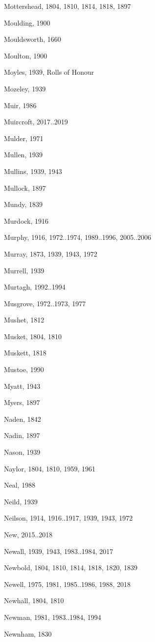 \begin{theindex}
\item Mottershead, 1804, 1810, 1814, 1818, 1897
\item Moulding, 1900
\item Mouldsworth, 1660
\item Moulton, 1900
\item Moyles, 1939, Rolls of Honour
\item Mozeley, 1939
\item Muir, 1986
\item Muircroft, 2017..2019
\item Mulder, 1971
\item Mullen, 1939
\item Mullins, 1939, 1943
\item Mullock, 1897
\item Mundy, 1839
\item Murdock, 1916
\item Murphy, 1916, 1972..1974, 1989..1996, 2005..2006
\item Murray, 1873, 1939, 1943, 1972
\item Murrell, 1939
\item Murtagh, 1992..1994
\item Musgrove, 1972..1973, 1977
\item Mushet, 1812
\item Musket, 1804, 1810
\item Muskett, 1818
\item Mustoe, 1990
\item Myatt, 1943
\item Myers, 1897
\item Naden, 1842
\item Nadin, 1897
\item Nason, 1939
\item Naylor, 1804, 1810, 1959, 1961
\item Neal, 1988
\item Neild, 1939
\item Neilson, 1914, 1916..1917, 1939, 1943, 1972
\item New, 2015..2018
\item Newall, 1939, 1943, 1983..1984, 2017
\item Newbold, 1804, 1810, 1814, 1818, 1820, 1839
\item Newell, 1975, 1981, 1985..1986, 1988, 2018
\item Newhall, 1804, 1810
\item Newman, 1981, 1983..1984, 1994
\item Newnham, 1830

\end{theindex}
